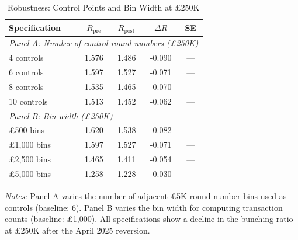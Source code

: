 \begin{table}[htbp]
\centering
\caption{Robustness: Control Points and Bin Width at \pounds 250K}
\label{tab:robustness_bw}
\begin{tabular}{lcccc}
\hline\hline
Specification & $R_{\text{pre}}$ & $R_{\text{post}}$ & $\Delta R$ & SE \\
\hline
\multicolumn{5}{l}{\textit{Panel A: Number of control round numbers (\pounds 250K)}} \\
4 controls & 1.576 & 1.486 & -0.090 & --- \\
6 controls & 1.597 & 1.527 & -0.071 & --- \\
8 controls & 1.535 & 1.465 & -0.070 & --- \\
10 controls & 1.513 & 1.452 & -0.062 & --- \\
\hline
\multicolumn{5}{l}{\textit{Panel B: Bin width (\pounds 250K)}} \\
\pounds 500 bins & 1.620 & 1.538 & -0.082 & --- \\
\pounds 1,000 bins & 1.597 & 1.527 & -0.071 & --- \\
\pounds 2,500 bins & 1.465 & 1.411 & -0.054 & --- \\
\pounds 5,000 bins & 1.258 & 1.228 & -0.030 & --- \\
\hline\hline
\end{tabular}
\begin{tablenotes}
\item \textit{Notes:} Panel A varies the number of adjacent \pounds 5K round-number bins used as controls (baseline: 6). Panel B varies the bin width for computing transaction counts (baseline: \pounds 1,000). All specifications show a decline in the bunching ratio at \pounds 250K after the April 2025 reversion.
\end{tablenotes}
\end{table}
